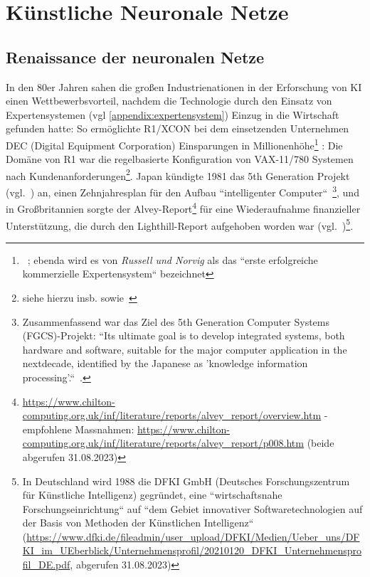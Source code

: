 \chapter{Künstliche Neuronale Netze}


\section{Renaissance der neuronalen Netze}\label{renaissance}


In den 80er Jahren sahen die großen Industrienationen in der Erforschung von KI einen Wettbewerbsvorteil, nachdem die Technologie durch den Einsatz von Expertensystemen (vgl \ref{appendix:expertensystem}) Einzug in die Wirtschaft gefunden hatte: So ermöglichte R1/XCON bei dem einsetzenden Unternehmen DEC (Digital Equipment Corporation) Einsparungen in Millionenhöhe\footnote{
    ~\cite[48]{RN09}; ebenda wird es von \textit{Russell und Norvig} als das ``erste erfolgreiche kommerzielle Expertensystem`` bezeichnet
} : Die Domäne von R1 war die regelbasierte Konfiguration von VAX-11/780 Systemen nach Kundenanforderungen\footnote{
    siehe hierzu insb. \cite{Mcd80} sowie~\cite[63]{Hor90}
}. Japan kündigte 1981 das 5th Generation Projekt (vgl.~\cite{Gar19}) an, einen Zehnjahresplan für den Aufbau ``intelligenter Computer``~\cite[48]{RN09}\footnote{
    Zusammenfassend war das Ziel des 5th Generation Computer Systems (FGCS)-Projekt: ``Its ultimate goal is to develop integrated systems, both hardware and software, suitable for the major computer application in the nextdecade, identified by the Japanese as 'knowledge information processing'.``~\cite[637]{Sha83}.
}, und in Großbritannien sorgte der Alvey-Report\footnote{
    \url{https://www.chilton-computing.org.uk/inf/literature/reports/alvey\_report/overview.htm} - empfohlene Massnahmen: \url{https://www.chilton-computing.org.uk/inf/literature/reports/alvey\_report/p008.htm} (beide abgerufen 31.08.2023)
} für eine Wiederaufnahme finanzieller Unterstützung, die durch den Lighthill-Report aufgehoben worden war (vgl.~\cite[48]{RN09})\footnote{
    In Deutschland wird 1988 die DFKI GmbH (Deutsches Forschungszentrum für Künstliche Intelligenz) gegründet, eine ``wirtschaftsnahe Forschungseinrichtung`` auf ``dem Gebiet innovativer Softwaretechnologien auf der Basis von Methoden der Künstlichen Intelligenz`` (\url{https://www.dfki.de/fileadmin/user\_upload/DFKI/Medien/Ueber\_uns/DFKI\_im\_UEberblick/Unternehmensprofil/20210120\_DFKI\_Unternehmensprofil\_DE.pdf}, abgerufen 31.08.2023)
}.


